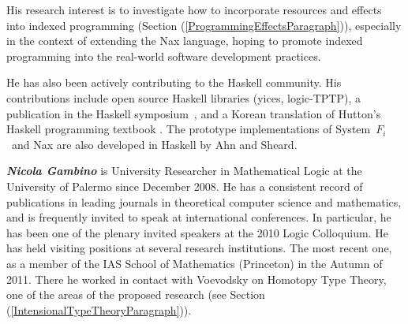 \documentclass[11pt,twocolumn]{article}
\newcommand{\pref}[1]{\,(\ref{#1})}
\newcommand{\SystemFi}{\mbox{System~$F_i$}}
\begin{document}
His research interest is to investigate how to incorporate resources and effects
into indexed programming (Section (\ref{ProgrammingEffectsParagraph})),
especially in the context of extending the Nax language, hoping to promote
indexed programming into the real-world software development practices.

He has also been actively contributing to the Haskell community.
His contributions include open source Haskell libraries (yices, logic-TPTP),
a publication in the Haskell symposium~\cite{AhnSheard08}, and
a Korean translation of Hutton's Haskell programming textbook \cite{Hutton07}.
The prototype implementations of \SystemFi\ and Nax are also developed
in Haskell by Ahn and Sheard.


\smallskip\noindent
\textbf{\em Nicola Gambino}
%
%
is University Researcher in Mathematical Logic at the University of Palermo
since December 2008.  He has a consistent record of publications in leading
journals in theoretical computer science and mathematics, and is frequently
invited to speak at international conferences.  
In particular, he has been one of the plenary invited speakers at the 2010
Logic Colloquium.  
He has held visiting positions at several research institutions. 
The most recent one, as %
a member of the IAS School of Mathematics (Princeton) in the Autumn of 2011.
There he worked in contact with Voevodsky %
on Homotopy Type Theory, one of the areas of the proposed research (see
Section\pref{IntensionalTypeTheoryParagraph}). 
\end{document}
